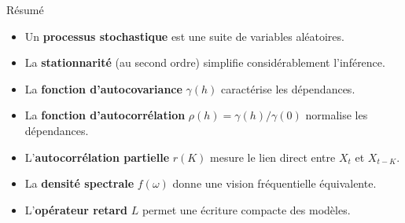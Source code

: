 \documentclass[11pt,aspectratio=169]{beamer}
\begin{document}
\begin{frame}{Résumé}

\begin{itemize}

\item Un \textbf{processus stochastique} est une suite de variables aléatoires.\newline

\item La \textbf{stationnarité} (au second ordre) simplifie considérablement l'inférence.\newline

\item La \textbf{fonction d'autocovariance} $\gamma(h)$ caractérise les dépendances.\newline

\item La \textbf{fonction d'autocorrélation} $\rho(h) = \gamma(h)/\gamma(0)$ normalise les dépendances.\newline

\item L'\textbf{autocorrélation partielle} $r(K)$ mesure le lien direct entre $X_t$ et $X_{t-K}$.\newline

\item La \textbf{densité spectrale} $f(\omega)$ donne une vision fréquentielle équivalente.\newline

\item L'\textbf{opérateur retard} $L$ permet une écriture compacte des modèles.

\end{itemize}

\end{frame}
\end{document}
